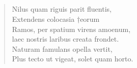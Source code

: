 \documentclass[11pt, a4paper]{report}
\begin{document}
            \subsection*{}
      \begin{verse}
      Nilus quam riguis parit fluentis, \\ Extendens colocasia †eorum \\ Ramos, per spatium virens amoenum, \\ laec nostris laribus creata frondet. \\ Naturam famulans opella vertit, \\ Plus tecto ut vigeat, solet quam horto. \\ 
      \end{verse}
  
\end{document}
